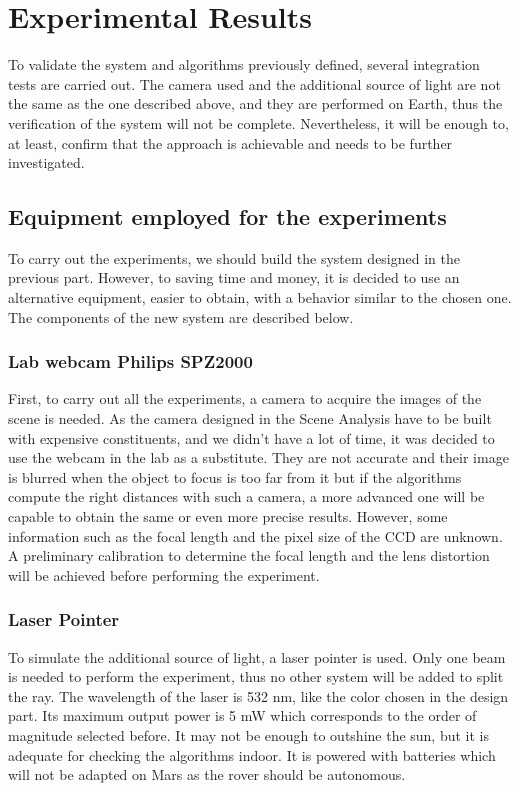 \chapter{Experimental Results}

To validate the system and algorithms previously defined, several integration tests are carried out. The camera used and the additional source of light are not the same as the one described above, and they are performed on Earth, thus the verification of the system will not be complete. Nevertheless, it will be enough to, at least, confirm that the approach is achievable and needs to be further investigated. 

\section{Equipment employed for the experiments}
To carry out the experiments, we should build the system designed in the previous part. However, to saving time and money, it is decided to use an alternative equipment, easier to obtain, with a behavior similar to the chosen one. The components of the new system are described below.

\subsection{Lab webcam Philips SPZ2000}
First, to carry out all the experiments, a camera to acquire the images of the scene is needed. As the camera designed in the Scene Analysis have to be built with expensive constituents, and we didn't have a lot of time, it was decided to use the webcam in the lab as a substitute. They are not accurate and their image is blurred when the object to focus is too far from it but if the algorithms compute the right distances with such a camera, a more advanced one will be capable to obtain the same or even more precise results. However, some information such as the focal length and the pixel size of the CCD are unknown. A preliminary calibration to determine the focal length and the lens distortion will be achieved before performing the experiment.

\subsection{Laser Pointer}
To simulate the additional source of light, a laser pointer is used. Only one beam is needed to perform the experiment, thus no other system will be added to split the ray. The wavelength of the laser is 532 nm, like the color chosen in the design part. Its maximum output power is 5 mW which corresponds to the order of magnitude selected before. It may not be enough to outshine the sun, but it is adequate for checking the algorithms indoor. It is powered with batteries which will not be adapted on Mars as the rover should be autonomous. 


